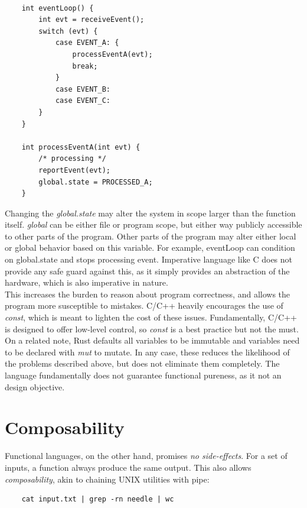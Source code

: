 \documentclass{kdp}
\begin{document}
\begin{verbatim}

    int eventLoop() { 
        int evt = receiveEvent();
        switch (evt) { 
            case EVENT_A: {
                processEventA(evt);
                break;
            }
            case EVENT_B:
            case EVENT_C:
        }
    }

    int processEventA(int evt) { 
        /* processing */ 
        reportEvent(evt);
        global.state = PROCESSED_A; 
    }
\end{verbatim}

Changing the \textit{global.state} may alter the system in scope larger than
the function itself. \textit{global} can be either file or program scope, but
either way publicly accessible to other parts of the program. Other parts of
the program may alter either local or global behavior based on this variable.
For example, eventLoop can condition on global.state and stops processing
event. Imperative language like C does not provide any safe guard against this,
as it simply provides an abstraction of the hardware, which is also imperative
in nature.\\

This increases the burden to reason about program correctness, and allows the
program more susceptible to mistakes. C/C++ heavily encourages the use of
\textit{const}, which is meant to lighten the cost of these issues.
Fundamentally, C/C++ is designed to offer low-level control, so \textit{const}
is a best practice but not the must. On a related note, Rust defaults all
variables to be immutable and variables need to be declared with \textit{mut}
to mutate. In any case, these reduces the likelihood of the problems described
above, but does not eliminate them completely. The language fundamentally does
not guarantee functional pureness, as it not an design objective.

\section{Composability}

Functional languages, on the other hand, promises \textit{no side-effects}. For
a set of inputs, a function always produce the same output. This also allows
\textit{composability}, akin to chaining UNIX utilities with pipe:

\begin{verbatim}
    cat input.txt | grep -rn needle | wc
\end{verbatim}
\end{document}
